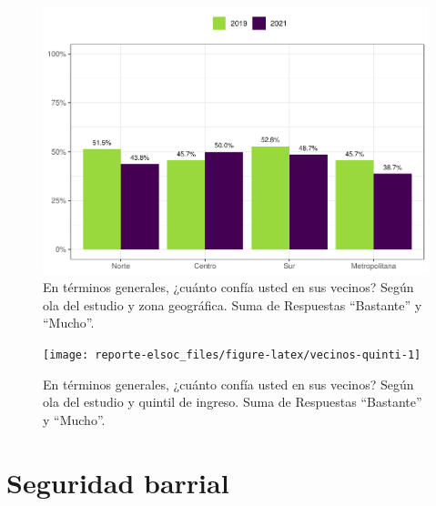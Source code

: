 \documentclass[
  12pt,
  openany]{book}
\begin{document}
\begin{figure}

{\centering \includegraphics{reporte-elsoc_files/figure-latex/vecinos-zona-1} 

}

\caption{En términos generales, ¿cuánto confía usted en sus vecinos? Según ola del estudio y zona geográfica. Suma de Respuestas “Bastante” y “Mucho”.}\label{fig:vecinos-zona}
\end{figure}

\begin{figure}

{\centering \texttt{[image: reporte-elsoc\_files/figure-latex/vecinos-quinti-1]} 

}

\caption{En términos generales, ¿cuánto confía usted en sus vecinos? Según ola del estudio y quintil de ingreso. Suma de Respuestas “Bastante” y “Mucho”.}\label{fig:vecinos-quinti}
\end{figure}

\hypertarget{seguridad-barrial}{%
\section{Seguridad barrial}\label{seguridad-barrial}}
\end{document}
